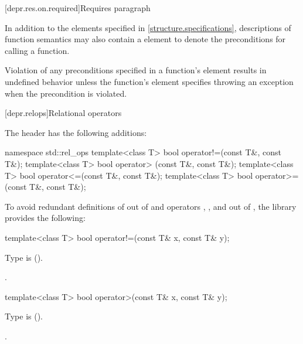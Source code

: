 [depr.res.on.required]{Requires paragraph}

\pnum
In addition to the elements specified in \ref{structure.specifications},
descriptions of function semantics may also contain a \requires element
to denote the preconditions for calling a function.

\pnum
{}%
Violation of any preconditions specified in a function's \requires element
results in undefined behavior
unless the function's \throws element
specifies throwing an exception when the precondition is violated.

[depr.relops]{Relational operators}%
%

\pnum
The header  has the following additions:

\begin{codeblock}
namespace std::rel_ops {
  template<class T> bool operator!=(const T&, const T&);
  template<class T> bool operator> (const T&, const T&);
  template<class T> bool operator<=(const T&, const T&);
  template<class T> bool operator>=(const T&, const T&);
}
\end{codeblock}

\pnum
To avoid redundant definitions of  out of 
and operators \tcode{>}, \tcode{<=}, and \tcode{>=} out of ,
the library provides the following:

%
\begin{itemdecl}
template<class T> bool operator!=(const T& x, const T& y);
\end{itemdecl}

\begin{itemdescr}
\pnum
\requires
Type  is  ().

\pnum
\returns
{}.
\end{itemdescr}

%
\begin{itemdecl}
template<class T> bool operator>(const T& x, const T& y);
\end{itemdecl}

\begin{itemdescr}
\pnum
\requires
Type  is  ().

\pnum
\returns
{}.
\end{itemdescr}

